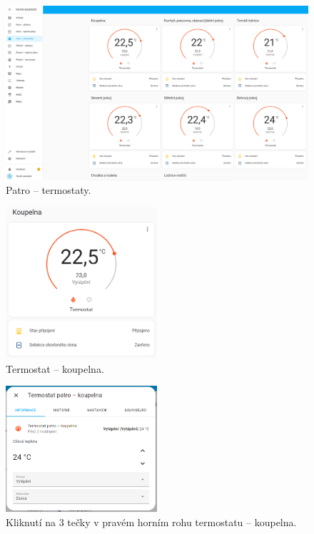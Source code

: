 \begin{Czech}
\begin{figure}[H]
    \centering
    \includegraphics[width=1\textwidth]{pictures/czech/software/thermostats-first-floor.png}
    \caption{Patro – termostaty.}
    \label{fig:thermostats-first-floor}
\end{figure}
\end{Czech}

\begin{Czech}
\begin{figure}[H]
    \centering
    \includegraphics[width=0.5\textwidth]{pictures/czech/software/thermostat.png}
    \caption{Termostat – koupelna.}
    \label{fig:thermostat}
\end{figure}
\end{Czech}

\begin{Czech}
\begin{figure}[H]
    \centering
    \includegraphics[width=0.5\textwidth]{pictures/czech/software/click-thermostat.png}
    \caption{Kliknutí na 3 tečky v pravém horním rohu termostatu – koupelna.}
    \label{fig:click-thermostat}
\end{figure}
\end{Czech}

